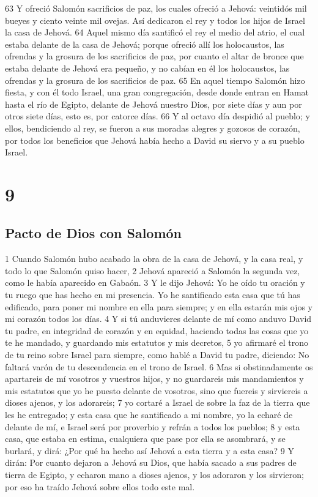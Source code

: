 63 Y ofreció Salomón sacrificios de paz, los cuales ofreció a Jehová: veintidós mil bueyes y ciento veinte mil ovejas. Así dedicaron el rey y todos los hijos de Israel la casa de Jehová.
64 Aquel mismo día santificó el rey el medio del atrio, el cual estaba delante de la casa de Jehová; porque ofreció allí los holocaustos, las ofrendas y la grosura de los sacrificios de paz, por cuanto el altar de bronce que estaba delante de Jehová era pequeño, y no cabían en él los holocaustos, las ofrendas y la grosura de los sacrificios de paz.
65 En aquel tiempo Salomón hizo fiesta, y con él todo Israel, una gran congregación, desde donde entran en Hamat hasta el río de Egipto, delante de Jehová nuestro Dios, por siete días y aun por otros siete días, esto es, por catorce días.
66 Y al octavo día despidió al pueblo; y ellos, bendiciendo al rey, se fueron a sus moradas alegres y gozosos de corazón, por todos los beneficios que Jehová había hecho a David su siervo y a su pueblo Israel.

\chapter{9}

\section*{Pacto de Dios con Salomón}

1 Cuando Salomón hubo acabado la obra de la casa de Jehová, y la casa real, y todo lo que Salomón quiso hacer,
2 Jehová apareció a Salomón la segunda vez, como le había aparecido en Gabaón. 
3 Y le dijo Jehová: Yo he oído tu oración y tu ruego que has hecho en mi presencia. Yo he santificado esta casa que tú has edificado, para poner mi nombre en ella para siempre; y en ella estarán mis ojos y mi corazón todos los días.
4 Y si tú anduvieres delante de mí como anduvo David tu padre, en integridad de corazón y en equidad, haciendo todas las cosas que yo te he mandado, y guardando mis estatutos y mis decretos,
5 yo afirmaré el trono de tu reino sobre Israel para siempre, como hablé a David tu padre, diciendo: No faltará varón de tu descendencia en el trono de Israel. 
6 Mas si obstinadamente os apartareis de mí vosotros y vuestros hijos, y no guardareis mis mandamientos y mis estatutos que yo he puesto delante de vosotros, sino que fuereis y sirviereis a dioses ajenos, y los adorareis;
7 yo cortaré a Israel de sobre la faz de la tierra que les he entregado; y esta casa que he santificado a mi nombre, yo la echaré de delante de mí, e Israel será por proverbio y refrán a todos los pueblos;
8 y esta casa, que estaba en estima, cualquiera que pase por ella se asombrará, y se burlará, y dirá: ¿Por qué ha hecho así Jehová a esta tierra y a esta casa? 
9 Y dirán: Por cuanto dejaron a Jehová su Dios, que había sacado a sus padres de tierra de Egipto, y echaron mano a dioses ajenos, y los adoraron y los sirvieron; por eso ha traído Jehová sobre ellos todo este mal.


